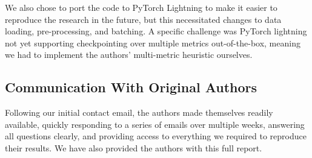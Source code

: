 We also chose to port the code to PyTorch Lightning to make it easier to reproduce the research in the future, but this necessitated changes to data loading, pre-processing, and batching. A specific challenge was PyTorch lightning not yet supporting checkpointing over multiple metrics out-of-the-box, meaning we had to implement the authors' multi-metric heuristic ourselves.

\subsection{Communication With Original Authors}

Following our initial contact email, the authors made themselves readily available, quickly responding to a series of emails over multiple weeks, answering all questions clearly, and providing access to everything we required to reproduce their results. We have also provided the authors with this full report.

\newpage